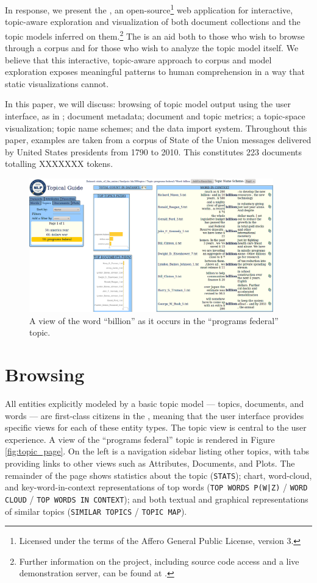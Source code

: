 \documentclass[11pt]{article}
\begin{document}
In response, we present the \tool, an open-source\footnote{Licensed under the terms of the Affero
General Public License, version 3.} web application for interactive,
topic-aware exploration and visualization of both document collections and the
topic models inferred on them.\footnote{Further information on the project, including
source code access and a live demonstration server, can be found
at \texttt{\projecturl}.} The \tool{} is an aid both to those who wish to
browse through a corpus and for those who wish to analyze the topic model itself.
We believe that this interactive, topic-aware approach to corpus and model exploration
exposes meaningful patterns to human comprehension in a way that static visualizations cannot.

In this paper, we will discuss: browsing of topic model output using the \tool{} user interface, as in \cite{gardner_browser_2010};
document metadata; document and topic metrics; a topic-space visualization;
topic name schemes; and the data import
system. Throughout this paper, examples are taken from a
corpus of State of the Union messages delivered by United States presidents
from 1790 to 2010. This constitutes 223 documents totalling XXXXXXX tokens. %

\begin{figure}[t]
 \centering
 \includegraphics[width=400px,keepaspectratio=true]{./topic_word_view.png}
 \caption{A view of the word ``billion'' as it occurs in the ``programs federal'' topic.}
 \label{fig:topic_word}
\end{figure}
\section{Browsing}
All entities explicitly modeled by a basic topic model --- topics, documents,
and words --- are first-class citizens in the \tool, meaning that the user
interface provides specific views for each of these entity types. The topic view
is central to the user experience. A view of the ``programs federal'' topic is
rendered in Figure \ref{fig:topic_page}. On the left is a navigation sidebar listing other topics,
with tabs providing links to other views such as Attributes, Documents, and Plots.
The remainder of the page shows statistics about the topic
(\texttt{STATS}); chart, word-cloud, and key-word-in-context representations of top
words (\texttt{TOP WORDS P(W|Z)} / \texttt{WORD CLOUD} / \texttt{TOP WORDS IN CONTEXT}); and
both textual and graphical representations of similar topics (\texttt{SIMILAR
TOPICS} / \texttt{TOPIC MAP}).
\end{document}
